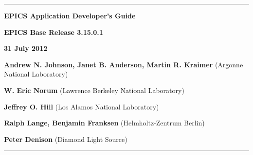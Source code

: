 \hrule

\vspace{1in}

\noindent \Huge \textbf{EPICS Application Developer's Guide}

\vspace{0.5in}

\noindent \Large \textbf{EPICS Base Release 3.15.0.1}

\noindent \textbf{31 July 2012}

\vspace{0.5in}

\normalsize
\noindent \textbf{Andrew N. Johnson, Janet B. Anderson, Martin R. Kraimer} (Argonne National Laboratory)

\noindent \textbf{W. Eric Norum} (Lawrence Berkeley National Laboratory)

\noindent \textbf{Jeffrey O. Hill} (Los Alamos National Laboratory)

\noindent \textbf{Ralph Lange, Benjamin Franksen} (Helmholtz-Zentrum Berlin)

\noindent \textbf{Peter Denison} (Diamond Light Source)

\vspace{1in}
\hrule
